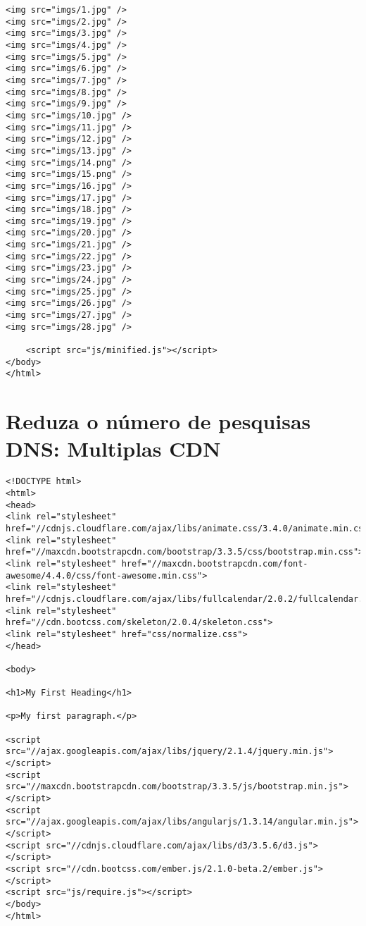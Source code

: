 \begin{apendicesenv}
\begin{lstlisting}
<img src="imgs/1.jpg" />
<img src="imgs/2.jpg" />
<img src="imgs/3.jpg" />
<img src="imgs/4.jpg" />
<img src="imgs/5.jpg" />
<img src="imgs/6.jpg" />
<img src="imgs/7.jpg" />
<img src="imgs/8.jpg" />
<img src="imgs/9.jpg" />
<img src="imgs/10.jpg" />
<img src="imgs/11.jpg" />
<img src="imgs/12.jpg" />
<img src="imgs/13.jpg" />
<img src="imgs/14.png" />
<img src="imgs/15.png" />
<img src="imgs/16.jpg" />
<img src="imgs/17.jpg" />
<img src="imgs/18.jpg" />
<img src="imgs/19.jpg" />
<img src="imgs/20.jpg" />
<img src="imgs/21.jpg" />
<img src="imgs/22.jpg" />
<img src="imgs/23.jpg" />
<img src="imgs/24.jpg" />
<img src="imgs/25.jpg" />
<img src="imgs/26.jpg" />
<img src="imgs/27.jpg" />
<img src="imgs/28.jpg" />

	<script src="js/minified.js"></script>
</body>
</html>

\end{lstlisting}

\chapter{Reduza o número de pesquisas DNS: Multiplas CDN}
\label{apend:codigo_reduzaonumerodepesquisasdns_mult}	

\begin{lstlisting}
<!DOCTYPE html>
<html>
<head>
<link rel="stylesheet" href="//cdnjs.cloudflare.com/ajax/libs/animate.css/3.4.0/animate.min.css">
<link rel="stylesheet" href="//maxcdn.bootstrapcdn.com/bootstrap/3.3.5/css/bootstrap.min.css">
<link rel="stylesheet" href="//maxcdn.bootstrapcdn.com/font-awesome/4.4.0/css/font-awesome.min.css">	
<link rel="stylesheet" href="//cdnjs.cloudflare.com/ajax/libs/fullcalendar/2.0.2/fullcalendar.js">
<link rel="stylesheet" href="//cdn.bootcss.com/skeleton/2.0.4/skeleton.css">
<link rel="stylesheet" href="css/normalize.css">
</head>

<body>

<h1>My First Heading</h1>

<p>My first paragraph.</p>

<script src="//ajax.googleapis.com/ajax/libs/jquery/2.1.4/jquery.min.js"></script>
<script src="//maxcdn.bootstrapcdn.com/bootstrap/3.3.5/js/bootstrap.min.js"></script>
<script src="//ajax.googleapis.com/ajax/libs/angularjs/1.3.14/angular.min.js"></script>
<script src="//cdnjs.cloudflare.com/ajax/libs/d3/3.5.6/d3.js"></script>
<script src="//cdn.bootcss.com/ember.js/2.1.0-beta.2/ember.js"></script>
<script src="js/require.js"></script>	
</body>
</html>


\end{lstlisting}
\end{apendicesenv}
